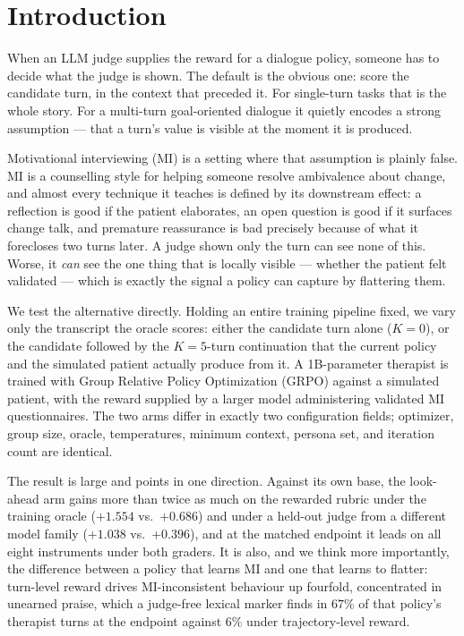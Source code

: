 \section{Introduction}
\label{sec:intro}

When an LLM judge supplies the reward for a dialogue policy, someone has to decide what the judge
is shown. The default is the obvious one: score the candidate turn, in the context that preceded
it. For single-turn tasks that is the whole story. For a multi-turn goal-oriented dialogue it
quietly encodes a strong assumption --- that a turn's value is visible at the moment it is
produced.

Motivational interviewing (MI) is a setting where that assumption is plainly false. MI is a
counselling style for helping someone resolve ambivalence about change, and almost every technique
it teaches is defined by its downstream effect: a reflection is good if the patient elaborates, an
open question is good if it surfaces change talk, and premature reassurance is bad precisely
because of what it forecloses two turns later. A judge shown only the turn can see none of this.
Worse, it \emph{can} see the one thing that is locally visible --- whether the patient felt
validated --- which is exactly the signal a policy can capture by flattering them.

We test the alternative directly. Holding an entire training pipeline fixed, we vary only the
transcript the oracle scores: either the candidate turn alone ($K{=}0$), or the candidate followed
by the $K{=}5$-turn continuation that the current policy and the simulated patient actually produce
from it. A 1B-parameter therapist is trained with Group Relative Policy Optimization (GRPO) against
a simulated patient, with the reward supplied by a larger model administering validated MI
questionnaires. The two arms differ in exactly two configuration fields; optimizer, group size,
oracle, temperatures, minimum context, persona set, and iteration count are identical.

The result is large and points in one direction. Against its own base, the look-ahead arm gains
more than twice as much on the rewarded rubric under the training oracle ($+1.554$ vs.\ $+0.686$)
and under a held-out judge from a different model family ($+1.038$ vs.\ $+0.396$), and at the
matched endpoint it leads on all eight instruments under both graders. It is also, and we think
more importantly, the difference between a policy that learns MI and one that learns to flatter:
turn-level reward drives MI-inconsistent behaviour up fourfold, concentrated in unearned praise,
which a judge-free lexical marker finds in $67\%$ of that policy's therapist turns at the endpoint
against $6\%$ under trajectory-level reward.

